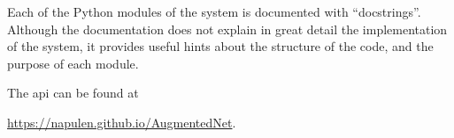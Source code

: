 
Each of the Python modules of the system is documented with
``docstrings''.
Although the documentation does not explain in great detail
the implementation of the system, it provides useful hints
about the structure of the code, and the purpose of each
module.

The \gls{api} can be found at


\href{https://napulen.github.io/AugmentedNet}{https://napulen.github.io/AugmentedNet}.
